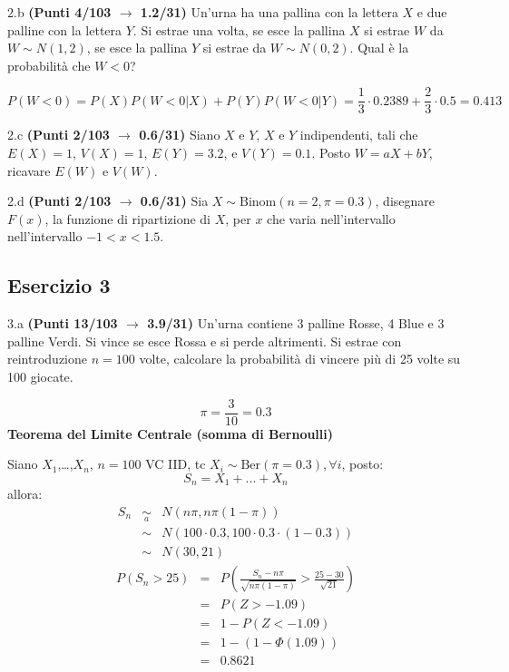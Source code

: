\documentclass[
  11pt,
]{book}
\theoremstyle{mytheoremstyle}
\theoremstyle{mydefstyle}
\newenvironment{sol}
  {
  \begin{tcolorbox}[enhanced,breakable,arc=0.1mm,boxrule=1pt,colback=white,colframe=iblue,
  title=\bf \fontfamily{lmss}\selectfont \hspace{.5 cm} Soluzione,drop fuzzy shadow]

}{
\end{tcolorbox}
  }
\begin{document}
2.b \textbf{(Punti 4/103 \(\rightarrow\) 1.2/31)} Un'urna ha una pallina con la lettera \(X\) e due palline con la lettera \(Y\).
Si estrae una volta, se esce la pallina \(X\) si estrae \(W\) da \(W\sim N(1,2)\), se esce la pallina \(Y\) si estrae da \(W\sim N(0,2)\). Qual è la probabilità che \(W<0\)?

\begin{sol}
\[
P(W<0)=P(X)P(W<0|X)+P(Y)P(W<0|Y)= \frac 13 \cdot0.2389+\frac 23 \cdot 0.5=0.413
\]

\end{sol}

2.c \textbf{(Punti 2/103 \(\rightarrow\) 0.6/31)} Siano \(X\) e \(Y\), \(X\) e \(Y\) indipendenti, tali che \(E(X)=1\), \(V(X)=1\), \(E(Y)=3.2\), e \(V(Y)=0.1\). Posto \(W=aX+bY\), ricavare \(E(W)\) e \(V(W)\).

2.d \textbf{(Punti 2/103 \(\rightarrow\) 0.6/31)} Sia \(X\sim\text{Binom}(n=2,\pi=0.3)\), disegnare \(F(x)\), la funzione di ripartizione di \(X\), per \(x\) che varia nell'intervallo nell'intervallo \(-1<x<1.5\).

\subsection{Esercizio 3}\label{esercizio-3-47}

3.a \textbf{(Punti 13/103 \(\rightarrow\) 3.9/31)} Un'urna contiene 3 palline Rosse, 4 Blue e 3 palline
Verdi. Si vince se esce Rossa e si perde altrimenti. Si estrae con reintroduzione \(n=100\) volte, calcolare la probabilità di vincere più di 25 volte su 100 giocate.

\begin{sol}
\[
\pi = \frac 3{10}=0.3
\]
\textbf{Teorema del Limite Centrale (somma di Bernoulli)}

Siano \(X_1\),\ldots,\(X_n\), \(n=100\) VC IID, tc \(X_i\sim\text{Ber}(\pi=0.3)\)\(,\forall i\), posto:
\[
      S_n = X_1 + ... + X_n
      \]
allora:\begin{eqnarray*}
  S_n & \mathop{\sim}\limits_{a}& N(n\pi,n\pi(1-\pi)) \\
      &\sim & N(100\cdot0.3,100\cdot0.3\cdot(1-0.3)) \\
      &\sim & N(30,21)
  \end{eqnarray*}\begin{eqnarray*}
      P( S_n   >   25 ) 
        &=& P\left(  \frac { S_n  -  n\pi }{ \sqrt{n\pi(1-\pi)} }  >  \frac { 25  -  30 }{\sqrt{ 21 }} \right)  \\
                 &=& P\left(  Z   >   -1.09 \right) \\    &=& 1-P(Z< -1.09 )\\ 
                 &=&  1-(1-\Phi( 1.09 )) \\ &=&  0.8621 
      \end{eqnarray*}

\end{sol}
\end{document}
